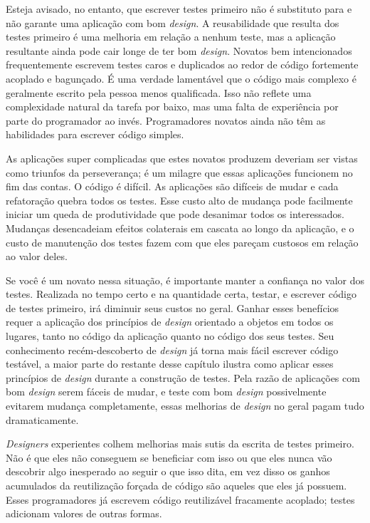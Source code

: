Esteja avisado, no entanto, que escrever testes primeiro não é substituto para e não garante uma aplicação com bom \textit{design}. A reusabilidade que resulta dos testes primeiro é uma melhoria em relação a nenhum teste, mas a aplicação resultante ainda pode cair longe de ter bom \textit{design}. Novatos bem intencionados frequentemente escrevem testes caros e duplicados ao redor de código fortemente acoplado e bagunçado. É uma verdade lamentável que o código mais complexo é geralmente escrito pela pessoa menos qualificada. Isso não reflete uma complexidade natural da tarefa por baixo, mas uma falta de experiência por parte do programador ao invés. Programadores novatos ainda não têm as habilidades para escrever código simples.

As aplicações super complicadas que estes novatos produzem deveriam ser vistas como triunfos da perseverança; é um milagre que essas aplicações funcionem no fim das contas. O código é difícil. As aplicações são difíceis de mudar e cada refatoração quebra todos os testes. Esse custo alto de mudança pode facilmente iniciar um queda de produtividade que pode desanimar todos os interessados. Mudanças desencadeiam efeitos colaterais em cascata ao longo da aplicação, e o custo de manutenção dos testes fazem com que eles pareçam custosos em relação ao valor deles.

Se você é um novato nessa situação, é importante manter a confiança no valor dos testes. Realizada no tempo certo e na quantidade certa, testar, e escrever código de testes primeiro, irá diminuir seus custos no geral. Ganhar esses benefícios requer a aplicação dos princípios de \textit{design} orientado a objetos em todos os lugares, tanto no código da aplicação quanto no código dos seus testes. Seu conhecimento recém-descoberto de \textit{design} já torna mais fácil escrever código testável, a maior parte do restante desse capítulo ilustra como aplicar esses princípios de \textit{design} durante a construção de testes. Pela razão de aplicações com bom \textit{design} serem fáceis de mudar, e teste com bom \textit{design} possivelmente evitarem mudança completamente, essas melhorias de \textit{design} no geral pagam tudo dramaticamente.

\textit{Designers} experientes colhem melhorias mais sutis da escrita de testes primeiro. Não é que eles não conseguem se beneficiar com isso ou que eles nunca vão descobrir algo inesperado ao seguir o que isso dita, em vez disso os ganhos acumulados da reutilização forçada de código são aqueles que eles já possuem. Esses programadores já escrevem código reutilizável fracamente acoplado; testes adicionam valores de outras formas.


